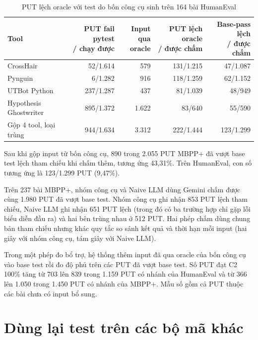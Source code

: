 \begin{table}[!htbp]
\centering
\caption{PUT lệch oracle với test do bốn công cụ sinh trên 164 bài HumanEval}
\label{tab:tool-aggregation-he}
\scriptsize
\begin{tabular*}{\linewidth}{@{\extracolsep{\fill}}lrrrr@{}}
\toprule
Tool & \shortstack{PUT fail pytest\\ / chạy được} & \shortstack{Input\\qua oracle} & \shortstack{PUT lệch oracle\\ / được chấm} & \shortstack{Base-pass lệch\\ / được chấm} \\
\midrule
CrossHair & 52/1.614 & 579 & 131/1.215 & 47/1.087 \\
Pynguin & 6/1.282 & 916 & 118/1.259 & 62/1.152 \\
UTBot Python & 237/1.287 & 437 & 81/1.039 & 48/949 \\
Hypothesis Ghostwriter & 895/1.372 & 1.622 & 83/640 & 55/590 \\
\midrule
Gộp 4 tool, loại trùng & 944/1.634 & 3.312 & 222/1.444 & 123/1.299 \\
\bottomrule
\end{tabular*}
\end{table}

Sau khi gộp input từ bốn công cụ, 890 trong 2.055 PUT MBPP+ đã vượt base test lệch tham chiếu khi chấm thêm, tương ứng 43,31\%. Trên HumanEval, con số tương ứng là 123/1.299 PUT (9,47\%).

Trên 237 bài MBPP+, nhóm công cụ và Naive LLM dùng Gemini chấm được cùng 1.980 PUT đã vượt base test. Nhóm công cụ ghi nhận 853 PUT lệch tham chiếu, Naive LLM ghi nhận 651 PUT lệch (trong đó có ba trường hợp chỉ gặp lỗi biểu diễn đầu ra) và hai bên trùng nhau ở 512 PUT. Hai phép chấm dùng chung bản tham chiếu nhưng khác quy tắc so sánh kết quả và thời hạn mỗi input (hai giây với nhóm công cụ, tám giây với Naive LLM).

Trong một phép đo bổ trợ, hệ thống thêm input đã qua oracle của bốn công cụ vào base test rồi đo độ phủ trên các PUT đã vượt base test. Số PUT đạt C2 100\% tăng từ 703 lên 839 trong 1.159 PUT có nhánh của HumanEval và từ 366 lên 1.050 trong 1.450 PUT có nhánh của MBPP+. Mẫu số gồm cả PUT thuộc các bài chưa có input bổ sung.



\section{Dùng lại test trên các bộ mã khác}
\label{sec:cross-model-evaluation}

